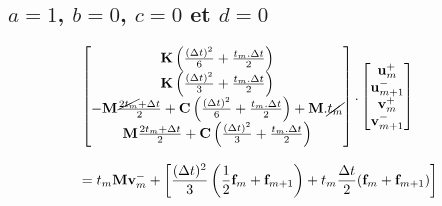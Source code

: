 \documentclass[12pt,a4paper]{report}
\begin{document}
\subsection{$a=1$, $b=0$, $c=0$ et $d=0$}
\begin{equation}
\begin{array}{l }
	\begin{bmatrix}	   
		   \mathbf{K}
			   \left( \frac{(\Delta t)^2}{6} + \frac{t_m.\Delta t}{2}
			   \right)
		\\   
		   \mathbf{K}
			   \left( \frac{(\Delta t)^2}{3} + \frac{t_m.\Delta t}{2}
			   \right)
		\\   
		   -\mathbf{M}
		   		\frac{\cancel{2t_m} + \Delta t}{2} 
		   +\mathbf{C}
		   		\left( \frac{(\Delta t)^2}{6} + \frac{t_m.\Delta t}{2} \right)  
		   +\mathbf{M}.\cancel{t_m}
		\\   
		   \mathbf{M}
		   		\frac{2t_m + \Delta t}{2} 
		   +\mathbf{C}
		   		\left( \frac{(\Delta t)^2}{3} + \frac{t_m.\Delta t}{2}\right)
	\end{bmatrix}
	.
	\begin{bmatrix}
		   \mathbf{u}_m^+  		\\
		   \mathbf{u}_{m+1}^-  	\\
		   \mathbf{v}_m^+  		\\
		   \mathbf{v}_{m+1}^-  	\\
	\end{bmatrix}
	\\
	\\
		=  t_m \mathbf{M} \mathbf{v}_m^-
		 +\displaystyle
		\left[
			\frac{(\Delta t)^2}{3}
				\left( \frac{1}{2} \mathbf{f}_m + \mathbf{f}_{m+1} \right)
			+t_m \frac{\Delta t}{2} (\mathbf{f}_m + \mathbf{f}_{m+1}) 
		\right]
	
\end{array}
\end{equation}
\end{document}
